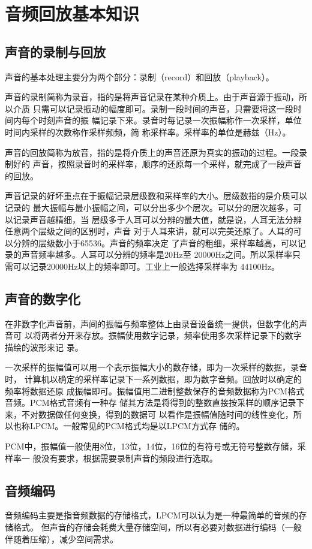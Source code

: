\documentclass[11pt]{article}
\begin{document}
\section{音频回放基本知识}
\subsection{声音的录制与回放}
    声音的基本处理主要分为两个部分：录制（record）和回放（playback）。

    声音的录制简称为录音，指的是将声音记录在某种介质上。由于声音源于振动，所以介质
只需可以记录振动的幅度即可。录制一段时间的声音，只需要将这一段时间内每个时刻声音的振
幅记录下来。录音时每记录一次振幅称作一次采样，单位时间内采样的次数称作采样频频，简
称采样率。采样率的单位是赫兹（Hz）。

    声音的回放简称为放音，指的是将介质上的声音还原为真实的振动的过程。一段录制好的
声音，按照录音时的采样率，顺序的还原每一个采样，就完成了一段声音的回放。

    声音记录的好坏重点在于振幅记录层级数和采样率的大小。层级数指的是介质可以记录的
最大振幅与最小振幅之间，可以分出多少个层次。可以分的层次越多，可以记录声音越精细，当
层级多于人耳可以分辨的最大值，就是说，人耳无法分辨任意两个层级之间的区别时，声音
对于人耳来讲，就可以完美还原了。人耳的可以分辨的层级数小于65536。声音的频率决定
了声音的粗细，采样率越高，可以记录的声音频率越多。人耳可以分辨的频率是20Hz至
20000Hz之间。所以采样率只需可以记录20000Hz以上的频率即可。工业上一般选择采样率为
44100Hz。

\subsection{声音的数字化}
    在非数字化声音前，声间的振幅与频率整体上由录音设备统一提供，但数字化的声音可
以将两者分开来存放。振幅使用数字记录，频率使用多次采样记录下的数字描绘的波形来记
录。

    一次采样的振幅值可以用一个表示振幅大小的数存储，即为一次采样的数据，录音时，
计算机以确定的采样率记录下一系列数据，即为数字音频。回放时以确定的频率将数据还原
成振幅即可。振幅值用二进制整数保存的音频数据称为PCM格式音频。PCM格式音频有一种存
储其方法是将得到的整数直接按采样的顺序记录下来，不对数据做任何变换，得到的数据可
以看作是振幅值随时间的线性变化，所以也称LPCM。一般常见的PCM格式均是以LPCM方式存
储的。
    
    PCM中，振幅值一般使用8位，13位，14位，16位的有符号或无符号整数存储，采样率一
般没有要求，根据需要录制声音的频段进行选取。

\subsection{音频编码}
    音频编码主要是指音频数据的存储格式，LPCM可以认为是一种最简单的音频的存储格式。
但声音的存储会耗费大量存储空间，所以有必要对数据进行编码（一般伴随着压缩），减少空间需求。
\end{document}

